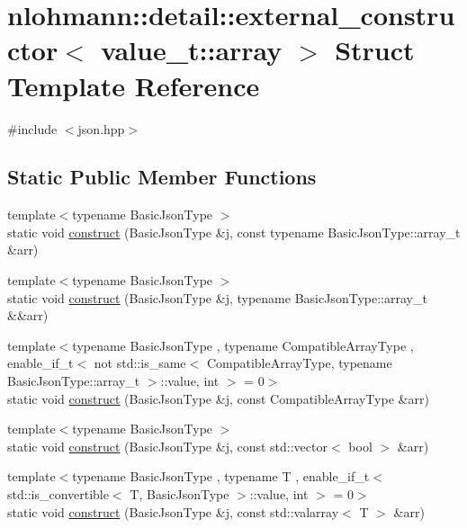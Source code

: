\hypertarget{structnlohmann_1_1detail_1_1external__constructor_3_01value__t_1_1array_01_4}{}\section{nlohmann\+:\+:detail\+:\+:external\+\_\+constructor$<$ value\+\_\+t\+:\+:array $>$ Struct Template Reference}
\label{structnlohmann_1_1detail_1_1external__constructor_3_01value__t_1_1array_01_4}


{\ttfamily \#include $<$json.\+hpp$>$}

\subsection*{Static Public Member Functions}
\begin{DoxyCompactItemize}
\item 
{\footnotesize template$<$typename Basic\+Json\+Type $>$ }\\static void \hyperlink{structnlohmann_1_1detail_1_1external__constructor_3_01value__t_1_1array_01_4_abfb2a6eec0bc21e8a7438546aebc55d8}{construct} (Basic\+Json\+Type \&j, const typename Basic\+Json\+Type\+::array\+\_\+t \&arr)
\item 
{\footnotesize template$<$typename Basic\+Json\+Type $>$ }\\static void \hyperlink{structnlohmann_1_1detail_1_1external__constructor_3_01value__t_1_1array_01_4_a50474d6624957a630a1d398cac1e7bfa}{construct} (Basic\+Json\+Type \&j, typename Basic\+Json\+Type\+::array\+\_\+t \&\&arr)
\item 
{\footnotesize template$<$typename Basic\+Json\+Type , typename Compatible\+Array\+Type , enable\+\_\+if\+\_\+t$<$ not std\+::is\+\_\+same$<$ Compatible\+Array\+Type, typename Basic\+Json\+Type\+::array\+\_\+t $>$\+::value, int $>$  = 0$>$ }\\static void \hyperlink{structnlohmann_1_1detail_1_1external__constructor_3_01value__t_1_1array_01_4_a110f50fd5378da876d9a6d6a8d945e37}{construct} (Basic\+Json\+Type \&j, const Compatible\+Array\+Type \&arr)
\item 
{\footnotesize template$<$typename Basic\+Json\+Type $>$ }\\static void \hyperlink{structnlohmann_1_1detail_1_1external__constructor_3_01value__t_1_1array_01_4_a4ebb19b1cb84b4cb224a4c5322e16f14}{construct} (Basic\+Json\+Type \&j, const std\+::vector$<$ bool $>$ \&arr)
\item 
{\footnotesize template$<$typename Basic\+Json\+Type , typename T , enable\+\_\+if\+\_\+t$<$ std\+::is\+\_\+convertible$<$ T, Basic\+Json\+Type $>$\+::value, int $>$  = 0$>$ }\\static void \hyperlink{structnlohmann_1_1detail_1_1external__constructor_3_01value__t_1_1array_01_4_a1b9226304e6492141080b4ebf228ddac}{construct} (Basic\+Json\+Type \&j, const std\+::valarray$<$ T $>$ \&arr)
\end{DoxyCompactItemize}


